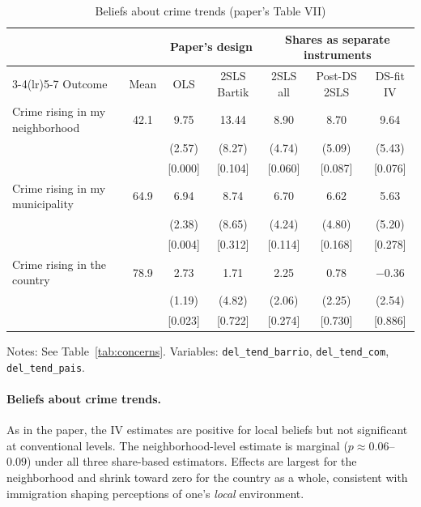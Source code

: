 \documentclass[11pt]{article}
\begin{document}
\begin{table}[htbp]
\centering
\small
\begin{threeparttable}
\caption{Beliefs about crime trends (paper's Table VII)}
\label{tab:beliefs}
\begin{tabular}{lcccccc}
\toprule
 & & \multicolumn{2}{c}{Paper's design} & \multicolumn{3}{c}{Shares as separate instruments}\\
\cmidrule(lr){3-4}\cmidrule(lr){5-7}
Outcome & Mean & OLS & 2SLS Bartik & 2SLS all & Post-DS 2SLS & DS-fit IV \\
\midrule
Crime rising in my neighborhood & 42.1 & 9.75 & 13.44 & 8.90 & 8.70 & 9.64 \\
 & & (2.57) & (8.27) & (4.74) & (5.09) & (5.43) \\
 & & [0.000] & [0.104] & [0.060] & [0.087] & [0.076] \\
\addlinespace
Crime rising in my municipality & 64.9 & 6.94 & 8.74 & 6.70 & 6.62 & 5.63 \\
 & & (2.38) & (8.65) & (4.24) & (4.80) & (5.20) \\
 & & [0.004] & [0.312] & [0.114] & [0.168] & [0.278] \\
\addlinespace
Crime rising in the country & 78.9 & 2.73 & 1.71 & 2.25 & 0.78 & $-0.36$ \\
 & & (1.19) & (4.82) & (2.06) & (2.25) & (2.54) \\
 & & [0.023] & [0.722] & [0.274] & [0.730] & [0.886] \\
\bottomrule
\end{tabular}
\begin{tablenotes}[flushleft]
\footnotesize
\item Notes: See Table~\ref{tab:concerns}. Variables: \texttt{del\_tend\_barrio},
\texttt{del\_tend\_com}, \texttt{del\_tend\_pais}.
\end{tablenotes}
\end{threeparttable}
\end{table}

\paragraph{Beliefs about crime trends.} As in the paper, the IV estimates are positive for
local beliefs but not significant at conventional levels. The neighborhood-level estimate
is marginal ($p \approx 0.06$--$0.09$) under all three share-based estimators. Effects are
largest for the neighborhood and shrink toward zero for the country as a whole, consistent
with immigration shaping perceptions of one's \emph{local} environment.
\end{document}
